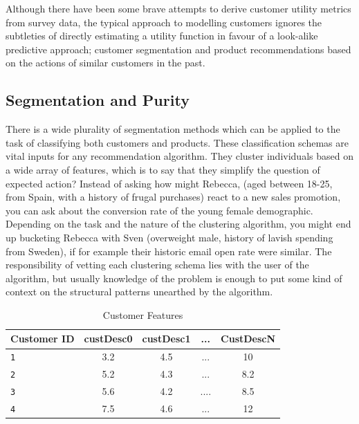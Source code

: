 \documentclass{tufte-handout}
\begin{document}
\noindent Although there have been some brave attempts to derive customer utility metrics from survey data, the typical approach to modelling customers ignores the subtleties of directly estimating a utility function in favour of a look-alike predictive approach; customer segmentation and product recommendations based on the actions of similar customers in the past. 

\subsection{Segmentation and Purity}
There is a wide plurality of segmentation methods which can be applied to the task of classifying both customers and products. These classification schemas are vital inputs for any recommendation algorithm. They cluster individuals based on a wide array of features, which is to say that they simplify the question of expected action? Instead of asking how might Rebecca, (aged between 18-25, from Spain, with a history of frugal purchases) react to a new sales promotion, you can ask about the conversion rate of the young female demographic. Depending on the task and the nature of the clustering algorithm, you might end up bucketing Rebecca with Sven (overweight male, history of lavish spending from Sweden), if for example their historic email open rate were similar. The responsibility of vetting each clustering schema lies with the user of the algorithm, but usually knowledge of the problem is enough to put some kind of context on the structural patterns unearthed by the algorithm. 

\begin{table}[htb]
\centering
\sffamily
\caption*{Customer Features}
\begin{tabular}{l*{4}{c}}
\toprule
 \bfseries Customer ID & \bfseries custDesc0 & \bfseries custDesc1 & \bfseries ... & \bfseries CustDescN \\
\midrule
\texttt{1}      & 3.2               & 4.5                 & ...                 & 10               \\
\texttt{2}   & 5.2               & 4.3                 & ...                  & 8.2              \\
\texttt{3} & 5.6              & 4.2                 & ....                & 8.5              \\
\texttt{4}     & 7.5              & 4.6                 & ...                 & 12               \\ \bottomrule
\end{tabular}
\end{table}
\end{document}
